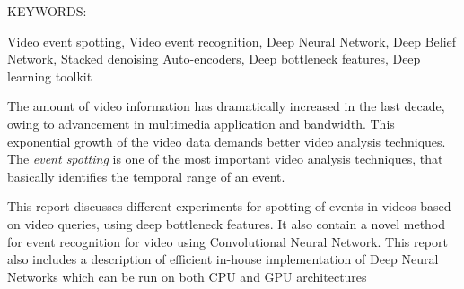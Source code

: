 \abstract

\noindent KEYWORDS: \hspace*{0.5em} \parbox[t]{4.4in}{Video event spotting, Video event recognition, Deep Neural Network, Deep Belief Network, Stacked denoising Auto-encoders, Deep bottleneck features, Deep learning toolkit }

\vspace*{24pt}

The amount of video information has dramatically increased in the last decade, owing to advancement in multimedia application and bandwidth.  This exponential growth of the video data demands better video analysis techniques.  The \textit{event spotting} is one of the most important video analysis techniques, that basically identifies the temporal range of an event.

This report discusses different experiments for spotting of events in videos based on video queries, using deep bottleneck features.  It also contain a novel method for event recognition for video using Convolutional Neural Network.  This report also includes a description of efficient in-house implementation of Deep Neural Networks which can be run on both CPU and GPU architectures
\pagebreak